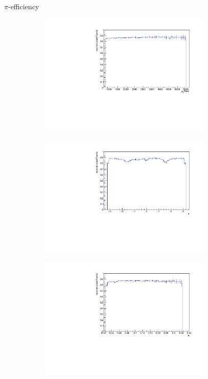 \documentclass[11pt]{beamer}
\begin{document}
\begin{frame}{$\pi$-efficiency}
\begin{figure}
\begin{subfigure}{0.45\textwidth}
\includegraphics[width=0.9\textwidth]{up_pdf/pos/h_pt_reco_Pi_pos.pdf}
\end{subfigure}
\begin{subfigure}{0.45\textwidth}
\includegraphics[width=0.9\textwidth]{up_pdf/pos/h_phi_reco_Pi_pos.pdf}
\end{subfigure}
\begin{subfigure}{0.45\textwidth}
\includegraphics[width=0.9\textwidth]{up_pdf/pos/h_theta_reco_Pi_pos.pdf}

\end{subfigure}
\end{figure}
\end{frame}
\end{document}
